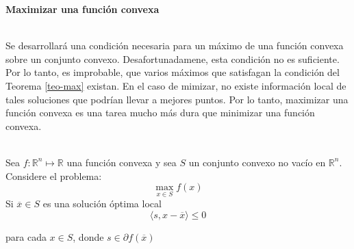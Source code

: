 \textbf{Maximizar una funci\'on convexa}\\
\

Se desarrollar\'a una condici\'on necesaria para un m\'aximo de una funci\'on convexa sobre un conjunto convexo. Desafortunadamene, esta
condici\'on no es suficiente. Por lo tanto, es improbable, que varios m\'aximos que satisfagan la condici\'on del Teorema \ref{teo-max} 
existan. En el caso de mimizar, no existe informaci\'on local de tales soluciones que podr\'ian llevar a mejores puntos. Por lo tanto, 
maximizar una funci\'on convexa es una tarea mucho m\'as dura que minimizar una funci\'on convexa.\\ \\

{\teorema Sea $f: \mathbb{R}^n \longmapsto \mathbb{R}$ una funci\'on convexa y sea $S$ un conjunto convexo no vac\'io en $\mathbb{R}^n.$
Considere el problema:
\[\max_{{x \in S}} f(x)\]
Si $\overline{x} \in S$ es una soluci\'on \'optima local 
\[\langle s, x - \overline{x} \rangle \leqslant 0\]

para cada $x \in S$, donde $s \in \partial f(\overline{x})$ \label{teo-max}}




